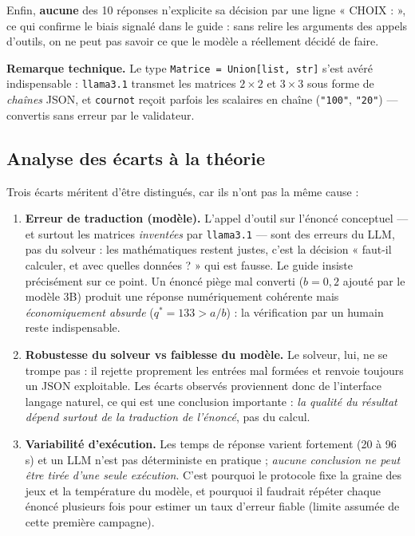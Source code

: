 \documentclass[11pt,a4paper]{article}
\begin{document}
Enfin, \textbf{aucune} des 10 réponses n'explicite sa décision par une ligne « CHOIX : »,
ce qui confirme le biais signalé dans le guide : sans relire les arguments des appels
d'outils, on ne peut pas savoir ce que le modèle a réellement décidé de faire.

\noindent\textbf{Remarque technique.} Le type \texttt{Matrice = Union[list, str]} s'est avéré
indispensable : \texttt{llama3.1} transmet les matrices $2\times2$ et $3\times3$ sous forme
de \emph{chaînes} JSON, et \texttt{cournot} reçoit parfois les scalaires en chaîne
(\texttt{"100"}, \texttt{"20"}) — convertis sans erreur par le validateur.

\subsection{Analyse des écarts à la théorie}
Trois écarts méritent d'être distingués, car ils n'ont pas la même cause :

\begin{enumerate}[nosep]
  \item \textbf{Erreur de traduction (modèle).} L'appel d'outil sur l'énoncé conceptuel — et
        surtout les matrices \emph{inventées} par \texttt{llama3.1} — sont des erreurs du LLM,
        pas du solveur : les mathématiques restent justes, c'est la décision « faut-il
        calculer, et avec quelles données ? » qui est fausse. Le guide insiste précisément sur
        ce point. Un énoncé piège mal converti ($b=0{,}2$ ajouté par le modèle 3B) produit une
        réponse numériquement cohérente mais \emph{économiquement absurde} ($q^{*}=133>a/b$) :
        la vérification par un humain reste indispensable.
  \item \textbf{Robustesse du solveur vs faiblesse du modèle.} Le solveur, lui, ne se trompe
        pas : il rejette proprement les entrées mal formées et renvoie toujours un JSON
        exploitable. Les écarts observés proviennent donc de l'interface langage naturel,
        ce qui est une conclusion importante : \emph{la qualité du résultat dépend surtout de
        la traduction de l'énoncé}, pas du calcul.
  \item \textbf{Variabilité d'exécution.} Les temps de réponse varient fortement (20 à 96 s)
        et un LLM n'est pas déterministe en pratique ; \emph{aucune conclusion ne peut être
        tirée d'une seule exécution}. C'est pourquoi le protocole fixe la graine des jeux et
        la température du modèle, et pourquoi il faudrait répéter chaque énoncé plusieurs fois
        pour estimer un taux d'erreur fiable (limite assumée de cette première campagne).
\end{enumerate}
\end{document}
